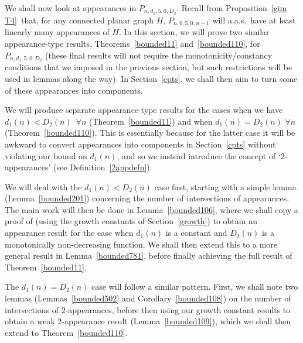 \documentclass{article}
\newtheorem{Proof of Theorem}{Proof of Theorem}
\begin{document}
We shall now look at appearances in $P_{n,d_{1},5,0,D_{2}}$.
Recall from Proposition~\ref{gim T4}~that, 
for any connected planar graph $H$, 
$P_{n,0,5,0,n-1}$ will a.a.s.~have at least linearly many appearances of $H$.
In this section,
we will prove two similar appearance-type results, 
Theorems~\ref{bounded11} and~\ref{bounded110},
for $P_{n,d_{1},5,0,D_{2}}$
(these final results will not require the monotonicity/constancy conditions that we imposed 
in the previous section,
but such restrictions will be used in lemmas along the way).
In Section~\ref{cpts},
we shall then aim to turn some of these appearances into components.

We will produce separate appearance-type results for the cases when we have
$d_{1}(n) < D_{2}(n)$~$\forall n$ (Theorem~\ref{bounded11})
and when $d_{1}(n) = D_{2}(n)$ $\forall n$ (Theorem~\ref{bounded110}). 
This is essentially because for the latter case it will be awkward 
to convert appearances into components in Section~\ref{cpts}
without violating our bound on $d_{1}(n)$,
and so we instead introduce the concept of `$2$-appearances' (see Definition~\ref{2appdefn}).

We will deal with the $d_{1}(n) < D_{2}(n)$ case first,
starting with a simple lemma (Lemma~\ref{bounded201}) concerning the number of intersections of appearances.
The main work will then be done in Lemma~\ref{bounded106},
where we shall copy a proof of \cite{mcd}
(using the growth constants of Section~\ref{growth})
to obtain an appearance result for the case when 
$d_{1}(n)$ is a constant and $D_{2}(n)$ is a monotonically non-decreasing function.
We shall then extend this to a more general result in Lemma~\ref{bounded781},
before finally achieving the full result of Theorem~\ref{bounded11}.

The $d_{1}(n)=D_{2}(n)$ case will follow a similar pattern.
First, we shall note two lemmas (Lemmas~\ref{bounded502} and Corollary~\ref{bounded108})
on the number of intersections of $2$-appearances,
before then using our growth constant results to obtain a weak $2$-appearance result (Lemma~\ref{bounded109}),
which we shall then extend to Theorem~\ref{bounded110}. 






\begin{figure}[omitted: a diagram of this paper's results, not reproduced here]\end{figure}
\end{document}

